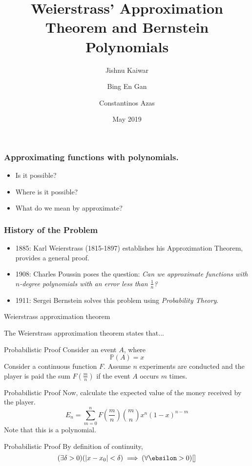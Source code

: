 \documentclass[mathserif,serif]{beamer}
\title{Weierstrass' Approximation Theorem and Bernstein Polynomials}
\author{Jishnu Kaiwar
  \and
  Bing En Gan
  \and
  Constantinos Azas}
\date{May 2019}
\begin{document}
\frame{\titlepage}

\begin{frame}
  \frametitle{Approximating functions with polynomials.}
  \begin{itemize}
  \item<+-> Is it possible?
  \item<+-> Where is it possible?
  \item<+-> What do we mean by approximate?

  \end{itemize}
\end{frame}

\begin{frame}
  \frametitle{History of the Problem}
  \begin{itemize}
  \item 1885: Karl Weierstrass (1815-1897) establishes his Approximation Theorem, provides a general proof.
  \item 1908: Charles Poussin poses the question: \emph{Can we approximate functions with $n$-degree polynomials with an error less than $\frac{1}{n}$?}
  \item 1911: Sergei Bernstein solves this problem using \emph{Probability Theory}.
  \end{itemize}
\end{frame}


\begin{frame}{Weierstrass approximation theorem}
\begin{theorem}
The Weierstrass approximation theorem states that...
\end{theorem}
\end{frame}

\begin{frame}{Probabilistic Proof}
Consider an event $A$, where
$$\mathbb{P}(A)=x$$
Consider a continuous function $F$.
\newline 
Assume $n$ experiments are conducted and the player is paid the sum $F(\frac{m}{n})$ if the event $A$ occurs $m$ times.    
\end{frame}

\begin{frame}{Probabilistic Proof}
Now, calculate the expected value of the money received by the player.
\begin{equation*}
      E_n = \sum_{m=0}^{n} F \left( \frac{m}{n} \right) \binom{m}{n} x^n (1-x)^{n-m}
\end{equation*}
Note that this is a polynomial.
\end{frame}

\begin{frame}{Probabilistic Proof}
  By definition of continuity,
  \begin{equation*}
    (\exists\delta>0)(|x-x_0|<\delta)\implies(\forall\ebsilon>0)[]
  \end{equation*}
\end{frame}
\end{document}
